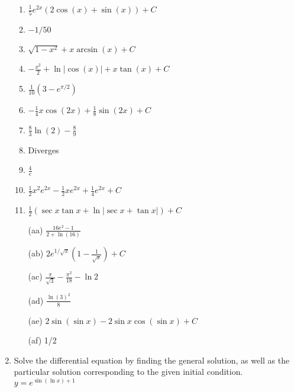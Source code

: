 \documentclass[letterpaper]{article}
\begin{document}
\begin{enumerate}
\begin{enumerate}
	\item $\frac{1}{5} e^{2 x} (2 \cos(x)+\sin(x))+C$

	\item $-1/50$

	\item $\sqrt{1-x^2}+x \arcsin(x)+C$

	\item $-\frac{x^2}{2}+\ln|\cos(x)|+x \tan(x)+C$

	\item $\frac{1}{10} \left(3-e^{\pi /2}\right)$

	\item $-\frac{1}{4} x \cos(2 x)+\frac{1}{8} \sin(2 x)+C$

	\item $\frac{8}{3}\ln(2)-\frac{8}{9}$

	\item Diverges

	\item $\frac{4}{e}$

	\item $\frac12 x^2 e^{2x}- \frac12xe^{2x}+\frac14e^{2x}+C$

	\item $\frac{1}{2}\left(\sec x \tan x + \ln | \sec x + \tan x| \right)+C$

	\item[(aa)] $\frac{16e^2-1}{2+\ln(16)}$

	\item[(ab)] $2e^{1/\sqrt{x}}\left(1-\frac{1}{\sqrt x}\right)+C$

	\item[(ac)] $\frac{\pi}{\sqrt{3}}-\frac{\pi^2}{18}-\ln 2$

	\item[(ad)] $\frac{\ln(3)^2}{8}$

	\item[(ae)] $2\sin(\sin x)-2\sin x\cos(\sin x)+C$

	\item[(af)] 1/2
	\end{enumerate}


\item Solve the differential equation by finding the general solution, as well as the particular solution corresponding to the given initial condition.
	$y= e^{\sin(\ln x)+1}$

\end{enumerate}
\end{document}
